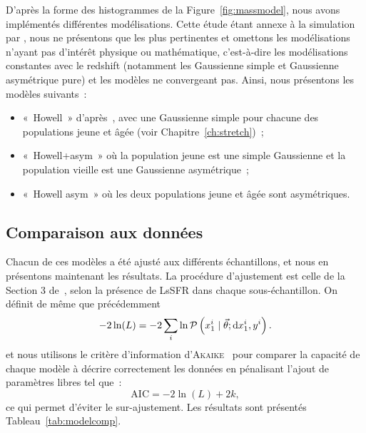 \documentclass[../main/main.tex]{subfiles}
\begin{document}
D'après la forme des histogrammes de la Figure~\ref{fig:massmodel}, nous avons
implémentés différentes modélisations. Cette étude étant annexe à la simulation
par \snana, nous ne présentons que les plus pertinentes et omettons les
modélisations n'ayant pas d'intérêt physique ou mathématique, c'est-à-dire les
modélisations constantes avec le redshift (notamment les Gaussienne simple et
Gaussienne asymétrique pure) et les modèles ne convergeant pas. Ainsi, nous
présentons les modèles suivants~:

\begin{itemize}
    \item «~Howell~» d'après~\cite{howell2007}, avec une Gaussienne simple pour
        chacune des populations jeune et âgée (voir Chapitre~\ref{ch:stretch})~;

    \item «~Howell+asym~» où la population jeune est une simple Gaussienne et la
        population vieille est une Gaussienne asymétrique~;

    \item «~Howell asym~» où les deux populations jeune et âgée sont
        asymétriques.
\end{itemize}

\subsection{Comparaison aux données}\label{ssec:mres}

Chacun de ces modèles a été ajusté aux différents échantillons, et nous en
présentons maintenant les résultats. La procédure d'ajustement est celle de la
Section 3 de~, selon la présence de LsSFR dans chaque
sous-échantillon. On définit de même que précédemment
\begin{equation}\label{eq:likelihood}
    -2\ln(L) = -2 \sum_i \ln \mathcal{P}\left(x_1^i \mid \vec{\theta};
    \mathrm{d}x_1^i, y^i\right).
\end{equation}
et nous utilisons le critère d'information
d'\textsc{Akaike}~\citep[AIC,][]{burnham2004} pour comparer la capacité de
chaque modèle à décrire correctement les données en pénalisant l'ajout de
paramètres libres tel que~:
\begin{equation}
    \mathrm{AIC} = -2\ln(L) + 2k,
\end{equation}
ce qui permet d'éviter le sur-ajustement. Les résultats sont présentés
Tableau~\ref{tab:modelcomp}.
\end{document}
